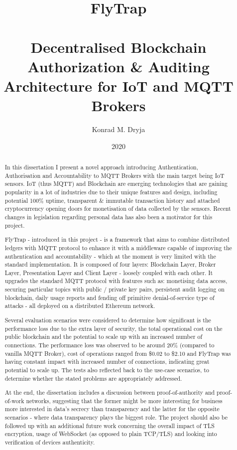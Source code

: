 \documentclass[msci]{abdnthesis}
\title{%
FlyTrap \\
\large\ \\
\huge Decentralised Blockchain Authorization \& Auditing Architecture for IoT and MQTT Brokers}
\author{Konrad M. Dryja}
\date{2020}
\begin{document}

\maketitle
\makedeclaration


\begin{abstract}
  In this dissertation I present a novel approach introducing Authentication, Authorisation and Accountability to MQTT Brokers with the main target being IoT sensors. IoT (thus MQTT) and Blockchain are emerging technologies that are gaining popularity in a lot of industries due to their unique features and design, including potential 100\% uptime, transparent \& immutable transaction history and attached cryptocurrency opening doors for monetisation of data collected by the sensors. Recent changes in legislation regarding personal data has also been a motivator for this project.
  
  FlyTrap - introduced in this project - is a framework that aims to combine distributed ledgers with MQTT protocol to enhance it with a middleware capable of improving the authentication and accountability - which at the moment is very limited with the standard implementation. It is composed of four layers: Blockchain Layer, Broker Layer, Presentation Layer and Client Layer - loosely coupled with each other. It upgrades the standard MQTT protocol with features such as: monetising data access, securing particular topics with public / private key pairs, persistent audit logging on blockchain, daily usage reports and fending off primitive denial-of-service type of attacks - all deployed on a distributed Ethereum network.
  
  Several evaluation scenarios were considered to determine how significant is the performance loss due to the extra layer of security, the total operational cost on the public blockchain and the potential to scale up with an increased number of connections. The performance loss was observed to be around 20\% (compared to vanilla MQTT Broker), cost of operations ranged from \$0.02 to \$2.10 and FlyTrap was having constant impact with increased number of connections, indicating great potential to scale up. The tests also reflected back to the use-case scenarios, to determine whether the stated problems are appropriately addressed.
  
  At the end, the dissertation includes a discussion between proof-of-authority and proof-of-work networks, suggesting that the former might be more interesting for business more interested in data's secrecy than transparency and the latter for the opposite scenarios - where data transparency plays the biggest role. The project should also be followed up with an additional future work concerning the overall impact of TLS encryption, usage of WebSocket (as opposed to plain TCP/TLS) and looking into verification of devices authenticity.
  

\end{abstract}
\end{document}
